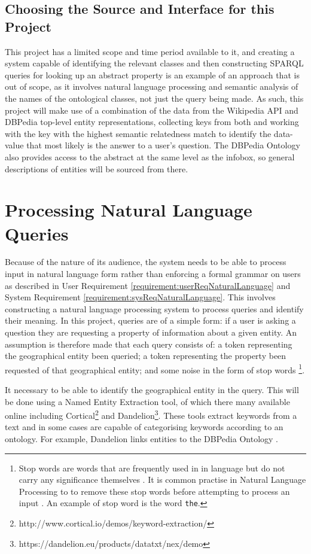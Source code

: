 \documentclass[authoryearcitations]{UoYCSproject}
\begin{document}
\subsection{Choosing the Source and Interface for this Project}
This project has a limited scope and time period available to it, and creating a system capable of identifying the relevant classes and then constructing SPARQL queries for looking up an abstract property is an example of an approach that is out of scope, as it involves natural language processing and semantic analysis of the names of the ontological classes, not just the query being made.  As such, this project will make use of a combination of the data from the Wikipedia API and DBPedia top-level entity representations, collecting keys from both and working with the key with the highest semantic relatedness match to identify the data-value that most likely is the answer to a user's question.  The DBPedia Ontology also provides access to the abstract at the same level as the infobox, so general descriptions of entities will be sourced from there.

\section{Processing Natural Language Queries}
Because of the nature of its audience, the system needs to be able to process input in natural language form rather than enforcing a formal grammar on users as described in User Requirement \ref{requirement:userReqNaturalLanguage} and System Requirement \ref{requirement:sysReqNaturalLanguage}. This involves constructing a natural language processing system to process queries and identify their meaning. In this project, queries are of a simple form: if a user is asking a question they are requesting a property of information about a given entity. An assumption is therefore made that each query consists of: a token representing the geographical entity been queried; a token representing the property been requested of that geographical entity; and some noise in the form of stop words 
\footnote{Stop words are words that are frequently used in in language but do not carry any significance themselves \cite{dataMiningStopWords}. It is common practise in Natural Language Processing to to remove these stop words before attempting to process an input \cite{dataMiningStopWords}. An example of stop word is the word \texttt{the}.}.

It necessary to be able to identify the geographical entity in the query. This will be done using a Named Entity Extraction tool, of which there many available online including Cortical\footnote{http://www.cortical.io/demos/keyword-extraction/} and Dandelion\footnote{https://dandelion.eu/products/datatxt/nex/demo}. These tools extract keywords from a text and in some cases are capable of categorising keywords according to an ontology. For example, Dandelion links entities to the DBPedia Ontology \cite{dandelionNex}.
\end{document}
